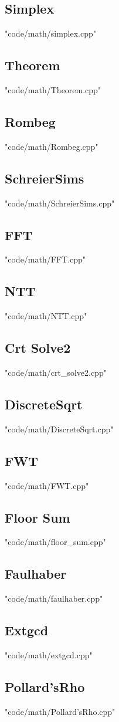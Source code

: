 \documentclass [8pt,a4paper,twocolumn]{article}
\begin{document}
\subsection{Simplex}
 {"code/math/simplex.cpp"}
\subsection{Theorem}
 {"code/math/Theorem.cpp"}
\subsection{Rombeg}
 {"code/math/Rombeg.cpp"}
\subsection{SchreierSims}
 {"code/math/SchreierSims.cpp"}
\subsection{FFT}
 {"code/math/FFT.cpp"}
\subsection{NTT}
 {"code/math/NTT.cpp"}
\subsection{Crt Solve2}
 {"code/math/crt_solve2.cpp"}
\subsection{DiscreteSqrt}
 {"code/math/DiscreteSqrt.cpp"}
\subsection{FWT}
 {"code/math/FWT.cpp"}
\subsection{Floor Sum}
 {"code/math/floor_sum.cpp"}
\subsection{Faulhaber}
 {"code/math/faulhaber.cpp"}
\subsection{Extgcd}
 {"code/math/extgcd.cpp"}
\subsection{Pollard’sRho}
 {"code/math/Pollard’sRho.cpp"}


\end{document}
